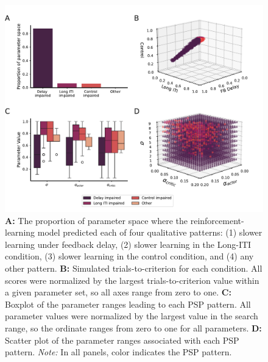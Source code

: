 \documentclass[doc, floatsintext]{apa7}
\begin{document}
\begin{figure}
  \centering
  \includegraphics[width=1\textwidth]{../figures/model_procedural_reinforcement.pdf}
  \caption{ 
      \textbf{A:} The proportion of parameter space where
      the reinforcement-learning model predicted each of
      four qualitative patterns: (1) slower learning under
      feedback delay, (2) slower learning in the Long-ITI
      condition, (3) slower learning in the control
      condition, and (4) any other pattern. 
      \textbf{B:} Simulated trials-to-criterion for each
      condition. All scores were normalized by the largest
      trials-to-criterion value within a given parameter
      set, so all axes range from zero to one. 
      \textbf{C:} Boxplot of the parameter ranges leading to
      each PSP pattern. All parameter values were normalized
      by the largest value in the search range, so the
      ordinate ranges from zero to one for all parameters.
      \textbf{D:} Scatter plot of the parameter ranges
      associated with each PSP pattern. 
      \textit{Note:} In all panels, color indicates the PSP
      pattern.
    }
  \label{fig:RL_results}
\end{figure}
\end{document}
